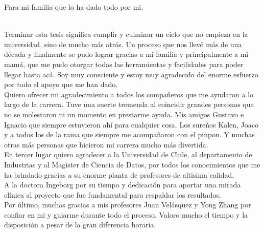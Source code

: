 \documentclass[
	spanish, %
	letterpaper, oneside
]{book}
\begin{document}
\begin{dedicatory}
	Para mi familia que lo ha dado todo por mi. \\	~ \\
\end{dedicatory}

\begin{acknowledgments}

Terminar esta tesis significa cumplir y culminar un ciclo que no empieza en la universidad, sino de mucho más atrás. Un proceso que nos llevó más de una década y finalmente se pudo lograr gracias a mi familia y principalmente a mi mamá, que me pudo otorgar todas las herramientas y facilidades para poder llegar hasta acá. Soy muy consciente y estoy muy agradecido del enorme esfuerzo por todo el apoyo que me han dado.\\

Quiero ofrecer mi agradecimiento a todos los compañeros que me ayudaron a lo largo de la carrera. Tuve una suerte tremenda al coincidir grandes personas que no se molestaron ni un momento en prestarme ayuda. Mis amigos Gustavo e Ignacio que siempre estuvieron ahí para cualquier cosa. Los sureños Kalen, Joaco y a todos los de la rama que siempre me acompañaron con el pinpon. Y muchas otras más personas que hicieron mi carrera mucho más divertida.\\

En tercer lugar quiero agradecer a la Universidad de Chile, al departamento de Industrias y al Magister de Ciencia de Datos, por todos los conocimientos que me ha brindado gracias a su enorme planta de profesores de altisima calidad.\\

A la doctora Ingeborg por su tiempo y dedicación para aportar una mirada clínica al proyecto que fue fundamental para respaldar los resultados.\\

Por último, muchas gracias a mis profesores Juan Velásquez y Yong Zhang por confiar en mi y guiarme durante todo el proceso. Valoro mucho el tiempo y la disposición a pesar de la gran diferencia horaria.
\end{acknowledgments}

\templateIndex

\templateFinalcfg









\backmatter

{\small
\setlength{\bibsep}{2pt plus 1pt minus 1pt}

}


\end{document}
